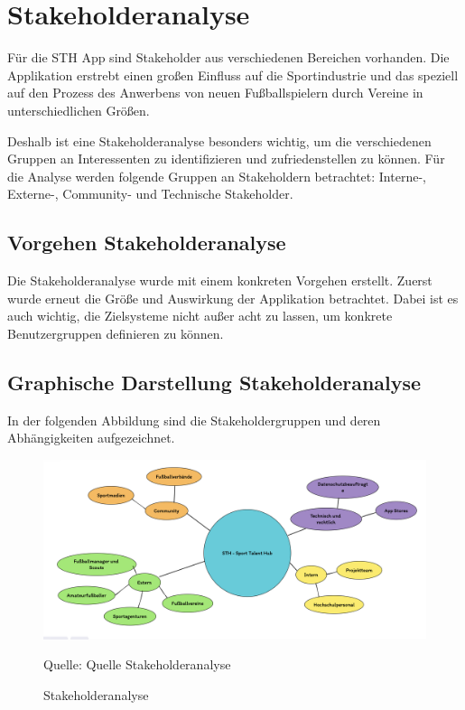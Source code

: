 \chapter{Stakeholderanalyse}

Für die STH App sind Stakeholder aus verschiedenen Bereichen vorhanden.
Die Applikation erstrebt einen großen Einfluss auf die Sportindustrie und das speziell auf den Prozess des Anwerbens von neuen Fußballspielern durch Vereine in unterschiedlichen Größen.

Deshalb ist eine Stakeholderanalyse besonders wichtig, um die verschiedenen Gruppen an Interessenten zu identifizieren und zufriedenstellen zu können.
Für die Analyse werden folgende Gruppen an Stakeholdern betrachtet: Interne-, Externe-, Community- und Technische Stakeholder.

\section{Vorgehen Stakeholderanalyse}

Die Stakeholderanalyse wurde mit einem konkreten Vorgehen erstellt.
Zuerst wurde erneut die Größe und Auswirkung der Applikation betrachtet.
Dabei ist es auch wichtig, die Zielsysteme nicht außer acht zu lassen, um konkrete Benutzergruppen definieren zu können.


\section{Graphische Darstellung Stakeholderanalyse}

In der folgenden Abbildung sind die Stakeholdergruppen und deren Abhängigkeiten aufgezeichnet.

\begin{figure}
	\caption[Stakeholderanalyse]{Stakeholderanalyse}
	\centering
	\includegraphics[width=\textwidth]{assets/figures/Stakeholderanalyse.png}
    \begin{flushleft}
		Quelle: Quelle Stakeholderanalyse
	\end{flushleft}
\end{figure}

